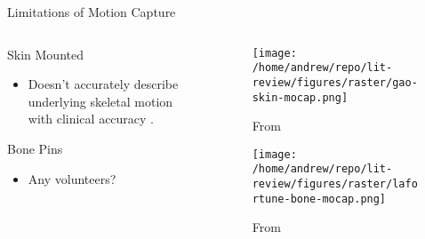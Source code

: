 \documentclass[presentation, aspectratio=1610]{beamer}
\begin{document}
\begin{frame}[label={sec:org25f0595}]{Limitations of Motion Capture}
\begin{columns}
\begin{column}{0.5\columnwidth}
Skin Mounted
\begin{itemize}
\item Doesn't accurately describe underlying skeletal motion with clinical accuracy \autocites{gaoInvestigationSoftTissue2008}[][]{kuoInfluenceSoftTissue2011}[][]{linEffectsSoftTissue2016}.
\end{itemize}
Bone Pins
\begin{itemize}
\item Any volunteers?
\end{itemize}
\end{column}

\begin{column}{0.6\columnwidth}
\begin{figure}[htbp]
\centering
\texttt{[image: /home/andrew/repo/lit-review/figures/raster/gao-skin-mocap.png]}
\caption{From \autocite{gaoInvestigationSoftTissue2008}}
\end{figure}
\vspace{-0.25in}
\begin{figure}[htbp]
\centering
\texttt{[image: /home/andrew/repo/lit-review/figures/raster/lafortune-bone-mocap.png]}
\caption{From \autocite{lafortuneThreedimensionalKinematicsHuman1992}}
\end{figure}
\end{column}
\end{columns}
\end{frame}
\end{document}

